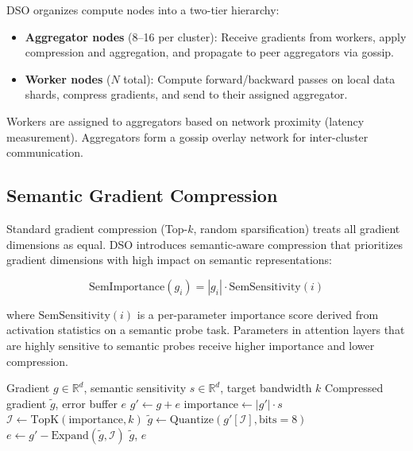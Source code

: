 \documentclass[11pt,a4paper]{article}
\begin{document}
DSO organizes compute nodes into a two-tier hierarchy:

\begin{itemize}
  \item \textbf{Aggregator nodes} (8--16 per cluster): Receive gradients from workers,
    apply compression and aggregation, and propagate to peer aggregators via gossip.
  \item \textbf{Worker nodes} ($N$ total): Compute forward/backward passes on local
    data shards, compress gradients, and send to their assigned aggregator.
\end{itemize}

Workers are assigned to aggregators based on network proximity (latency measurement).
Aggregators form a gossip overlay network for inter-cluster communication.

\subsection{Semantic Gradient Compression}

Standard gradient compression (Top-$k$, random sparsification) treats all gradient
dimensions as equal. DSO introduces semantic-aware compression that prioritizes
gradient dimensions with high impact on semantic representations:

\begin{equation}
\text{SemImportance}(g_i) = |g_i| \cdot \text{SemSensitivity}(i)
\end{equation}

where $\text{SemSensitivity}(i)$ is a per-parameter importance score derived from
activation statistics on a semantic probe task. Parameters in attention layers that
are highly sensitive to semantic probes receive higher importance and lower compression.

\begin{algorithm}[H]
\caption{Semantic Gradient Compression}
\begin{algorithmic}[1]
\REQUIRE Gradient $g \in \mathbb{R}^d$, semantic sensitivity $s \in \mathbb{R}^d$, target bandwidth $k$
\ENSURE Compressed gradient $\tilde{g}$, error buffer $e$
\STATE $g' \leftarrow g + e$ 
\STATE $\text{importance} \leftarrow |g'| \cdot s$
\STATE $\mathcal{I} \leftarrow \text{TopK}(\text{importance}, k)$ 
\STATE $\tilde{g} \leftarrow \text{Quantize}(g'[\mathcal{I}], \text{bits}=8)$
\STATE $e \leftarrow g' - \text{Expand}(\tilde{g}, \mathcal{I})$ 
\RETURN $\tilde{g}$, $e$
\end{algorithmic}
\end{algorithm}
\end{document}
